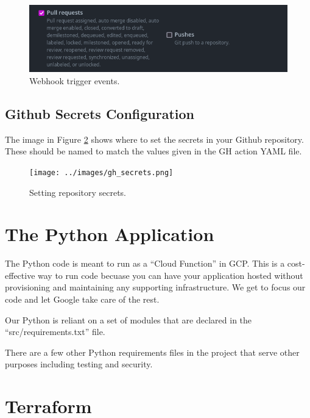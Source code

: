 \begin{figure}[ht]
	\includegraphics[width=12cm]{../images/webhook2.png}
	\caption{Webhook trigger events.}
	\label{wh2}
\end{figure}
\vspace{2mm}

\subsection{\label{sec:gh_secrets}Github Secrets Configuration}

\justifying
The image in Figure \ref{gh_secrets} shows where to set the secrets in your Github repository. These should be named to match the values given in the GH action YAML file.
\vspace{2mm}

\begin{figure}[ht]
	\texttt{[image: ../images/gh\_secrets.png]}
	\caption{Setting repository secrets.}
	\label{gh_secrets}
\end{figure}
\vspace{2mm}

\section{\label{sec:Python} The Python Application}

\justifying
The Python code is meant to run as a ``Cloud Function'' in GCP. This is a cost-effective way to run code becuase you can have
your application hosted without provisioning and maintaining any supporting infrastructure. We get to focus our code and let Google
take care of the rest.

\justifying
Our Python is reliant on a set of modules that are declared in the ``src/requirements.txt'' file.


\justifying
There are a few other Python requirements files in the project that serve other purposes including testing and security.


\section{\label{sec:tf}Terraform}

